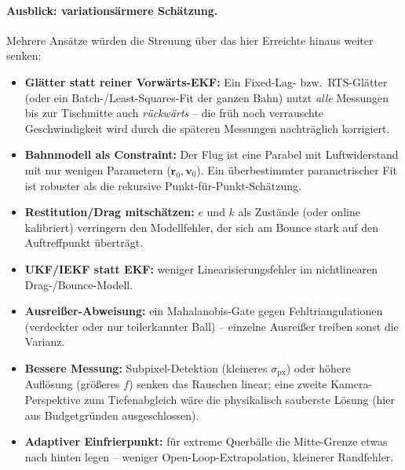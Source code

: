 \paragraph{Ausblick: variationsärmere Schätzung.} Mehrere Ansätze würden die
Streuung über das hier Erreichte hinaus weiter senken:
\begin{itemize}
\item \textbf{Glätter statt reiner Vorwärts-EKF:} Ein Fixed-Lag- bzw.\ RTS-Glätter
  (oder ein Batch-/Least-Squares-Fit der ganzen Bahn) nutzt \emph{alle} Messungen
  bis zur Tischmitte auch \emph{rückwärts} -- die früh noch verrauschte
  Geschwindigkeit wird durch die späteren Messungen nachträglich korrigiert.
\item \textbf{Bahnmodell als Constraint:} Der Flug ist eine Parabel mit
  Luftwiderstand mit nur wenigen Parametern ($\mathbf r_0,\mathbf v_0$). Ein
  überbestimmter parametrischer Fit ist robuster als die rekursive
  Punkt-für-Punkt-Schätzung.
\item \textbf{Restitution/Drag mitschätzen:} $e$ und $k$ als Zustände (oder online
  kalibriert) verringern den Modellfehler, der sich am Bounce stark auf den
  Auftreffpunkt überträgt.
\item \textbf{UKF/IEKF statt EKF:} weniger Linearisierungsfehler im nichtlinearen
  Drag-/Bounce-Modell.
\item \textbf{Ausreißer-Abweisung:} ein Mahalanobis-Gate gegen Fehltriangulationen
  (verdeckter oder nur teilerkannter Ball) -- einzelne Ausreißer treiben sonst die
  Varianz.
\item \textbf{Bessere Messung:} Subpixel-Detektion (kleineres $\sigma_{\text{px}}$)
  oder höhere Auflösung (größeres $f$) senken das Rauschen linear; eine zweite
  Kamera-Perspektive zum Tiefenabgleich wäre die physikalisch sauberste Lösung
  (hier aus Budgetgründen ausgeschlossen).
\item \textbf{Adaptiver Einfrierpunkt:} für extreme Querbälle die Mitte-Grenze
  etwas nach hinten legen -- weniger Open-Loop-Extrapolation, kleinerer Randfehler.
\end{itemize}

